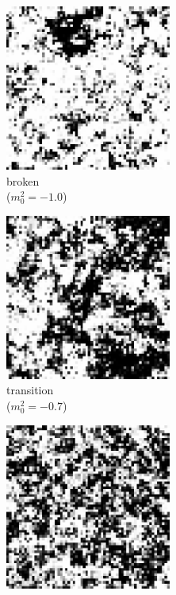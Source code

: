 \begin{figure}[h]
    \begin{center}
      \begin{subfigure}[b]{0.3\textwidth}\centering
        \includegraphics[width=0.6\textwidth]{imgs/broken.png}
        \caption{broken\\($m_0^2=-1.0$)}
      \end{subfigure}%
      \hfill
      \begin{subfigure}[b]{0.3\textwidth}\centering
        \includegraphics[width=0.6\textwidth]{imgs/transition.png}
        \caption{transition\\($m_0^2=-0.7$)}
      \end{subfigure}%
      \hfill
      \begin{subfigure}[b]{0.3\textwidth}\centering
        \includegraphics[width=0.6\textwidth]{imgs/symmetric.png}

\end{subfigure}
\end{center}
\end{figure}
